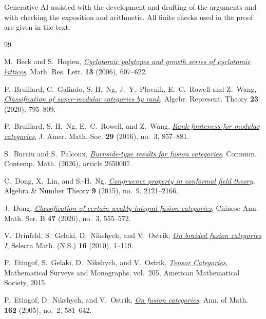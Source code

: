 \documentclass[11pt,a4paper]{article}
\numberwithin{equation}{section}
\theoremstyle{remark}
\begin{document}
Generative AI assisted with the development and drafting of the arguments and with checking the exposition and arithmetic. All finite checks used in the proof are given in the text.
\begin{thebibliography}{99}\small

M.~Beck and S.~Ho\c{s}ten, \href{https://doi.org/10.4310/mrl.2006.v13.n4.a10}{\emph{Cyclotomic polytopes and growth series of cyclotomic lattices}}, Math. Res. Lett. \textbf{13} (2006), 607--622.

P.~Bruillard, C.~Galindo, S.-H.~Ng, J.~Y.~Plavnik, E.~C.~Rowell and Z.~Wang,
\href{https://doi.org/10.1007/s10468-019-09873-9}{\emph{Classification of super-modular categories by rank}},
Algebr. Represent. Theory \textbf{23} (2020), 795--809.

P.~Bruillard, S.-H.~Ng, E.~C.~Rowell, and Z.~Wang,
\href{https://doi.org/10.1090/jams/842}{\emph{Rank-finiteness for modular categories}},
J. Amer. Math. Soc. \textbf{29} (2016), no.~3, 857--881.

S.~Burciu and S.~Palcoux,
\href{https://doi.org/10.1142/S0219199726500070}{\emph{Burnside-type results for fusion categories}},
Commun. Contemp. Math. (2026), article 2650007.

C.~Dong, X.~Lin, and S.-H.~Ng,
\href{https://doi.org/10.2140/ant.2015.9.2121}{\emph{Congruence property in conformal field theory}},
Algebra \& Number Theory \textbf{9} (2015), no.~9, 2121--2166.

J.~Dong,
\href{https://doi.org/10.1007/s11401-026-0019-6}{\emph{Classification of certain weakly integral fusion categories}},
Chinese Ann. Math. Ser. B \textbf{47} (2026), no.~3,
555--572.

V.~Drinfeld, S.~Gelaki, D.~Nikshych, and V.~Ostrik,
\href{https://doi.org/10.1007/s00029-010-0017-z}{\emph{On braided fusion categories I}},
Selecta Math. (N.S.) \textbf{16} (2010), 1--119.

P.~Etingof, S.~Gelaki, D.~Nikshych, and V.~Ostrik,
\href{https://math.mit.edu/~etingof/egnobookfinal.pdf}{\emph{Tensor Categories}},
Mathematical Surveys and Monographs, vol.~205,
American Mathematical Society, 2015.

P.~Etingof, D.~Nikshych, and V.~Ostrik,
\href{https://doi.org/10.4007/annals.2005.162.581}{\emph{On fusion categories}},
Ann. of Math. \textbf{162} (2005), no.~2, 581--642.


\end{thebibliography}
\end{document}
